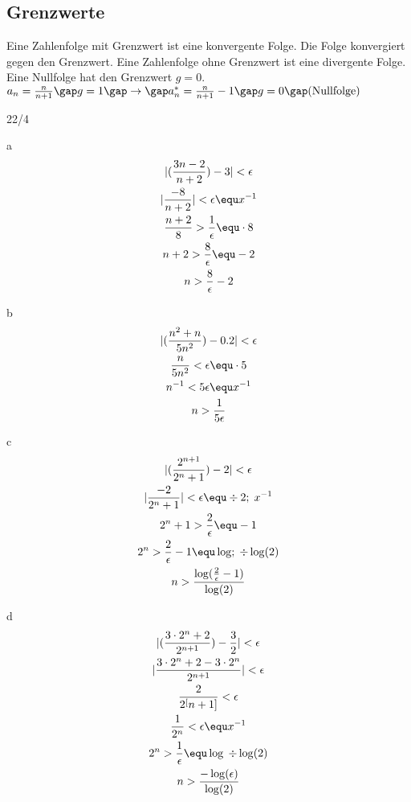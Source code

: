 \subsection{Grenzwerte}
Eine Zahlenfolge mit Grenzwert ist eine konvergente Folge. Die Folge konvergiert gegen den Grenzwert. Eine Zahlenfolge ohne Grenzwert ist eine divergente Folge. Eine Nullfolge hat den Grenzwert $g = 0$. \\
$a_n = \frac{n}{n+1}\gap g = 1\gap \rightarrow\gap a_n^\ast = \frac{n}{n+1} - 1\gap g = 0\gap \text{(Nullfolge)}$
\begin{exercise}{22/4}
  \item [a]
  \begin{gather*}
    |(\frac{3n-2}{n+2}) - 3| < \epsilon \\
    |\frac{-8}{n+2}| < \epsilon \equ x^{-1} \\
    \frac{n+2}{8} > \frac{1}{\epsilon} \equ \cdot 8 \\
    n + 2 > \frac{8}{\epsilon} \equ -2 \\
    n > \frac{8}{\epsilon} - 2
  \end{gather*}
  \item [b]
  \begin{gather*}
    |(\frac{n^2+n}{5n^2}) - 0.2| < \epsilon \\
    \frac{n}{5n^2} < \epsilon \equ \cdot 5 \\
    n^{-1} < 5 \epsilon \equ x^{-1} \\
    n > \frac{1}{5 \epsilon}
  \end{gather*}
  \item [c]
  \begin{gather*}
    |(\frac{2^{n + 1}}{2^n + 1}) - 2| < \epsilon \\
    |\frac{-2}{2^n + 1}| < \epsilon \equ \div 2;\; x^{-1} \\
    2^n + 1 > \frac{2}{\epsilon} \equ -1 \\
    2^n > \frac{2}{\epsilon} - 1 \equ \log;\; \div \log(2) \\
    n > \frac{\log(\frac{2}{\epsilon} - 1)}{\log(2)}
  \end{gather*}
  \item [d]
  \begin{gather*}
    |(\frac{3 \cdot 2^n + 2}{2^{n+1}}) - \frac{3}{2}| < \epsilon \\
    |\frac{3 \cdot 2^n + 2 - 3 \cdot 2^n}{2^{n+1}}| < \epsilon \\
    \frac{2}{2^[n+1]} < \epsilon \\
    \frac{1}{2^n} < \epsilon \equ x^{-1} \\
    2^n > \frac{1}{\epsilon} \equ \log\; \div \log(2) \\
    n > \frac{-\log(\epsilon)}{\log(2)}
  \end{gather*}
\end{exercise}
